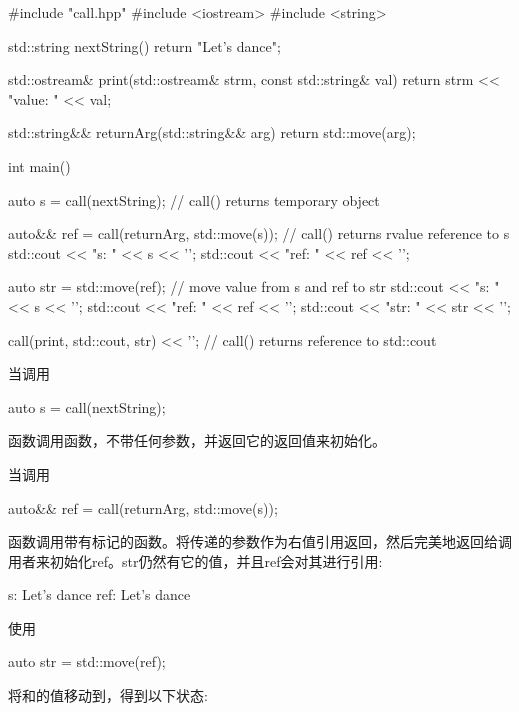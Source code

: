 \begin{cppcode}
#include "call.hpp"
#include <iostream>
#include <string>

std::string nextString()
{
	return "Let's dance";
}

std::ostream& print(std::ostream& strm, const std::string& val)
{
	return strm << "value: " << val;
}

std::string&& returnArg(std::string&& arg)
{
	return std::move(arg);
}

int main()
{
	auto s = call(nextString); // call() returns temporary object

	auto&& ref = call(returnArg, std::move(s)); // call() returns rvalue reference to s
	std::cout << "s: " << s << '\n';
	std::cout << "ref: " << ref << '\n';

	auto str = std::move(ref); // move value from s and ref to str
	std::cout << "s: " << s << '\n';
	std::cout << "ref: " << ref << '\n';
	std::cout << "str: " << str << '\n';

	call(print, std::cout, str) << '\n'; // call() returns reference to std::cout
}
\end{cppcode}

当调用

\begin{cppcode}
auto s = call(nextString);
\end{cppcode}

函数调用函数，不带任何参数，并返回它的返回值来初始化。

当调用

\begin{cppcode}
auto&& ref = call(returnArg, std::move(s));
\end{cppcode}

函数调用带有标记的函数。将传递的参数作为右值引用返回，然后完美地返回给调用者来初始化ref。str仍然有它的值，并且ref会对其进行引用:

\begin{outputcode}
s: Let's dance
ref: Let's dance
\end{outputcode}

使用

\begin{cppcode}
auto str = std::move(ref);
\end{cppcode}

将和的值移动到，得到以下状态:

